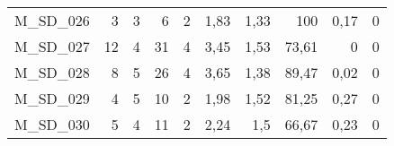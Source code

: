 \documentclass{article}
\begin{document}
\begin{table}[htbp]
\begin{tabular}{lrrrrrrrrr}
    M\_SD\_026 & 3    & 3    & 6    & 2    & 1,83 & 1,33 & 100  & 0,17 & 0 \\
    M\_SD\_027 & 12   & 4    & 31   & 4    & 3,45 & 1,53 & 73,61 & 0    & 0 \\
    M\_SD\_028 & 8    & 5    & 26   & 4    & 3,65 & 1,38 & 89,47 & 0,02 & 0 \\
    M\_SD\_029 & 4    & 5    & 10   & 2    & 1,98 & 1,52 & 81,25 & 0,27 & 0 \\
    M\_SD\_030 & 5    & 4    & 11   & 2    & 2,24 & 1,5  & 66,67 & 0,23 & 0 \\
    \bottomrule
    \end{tabular}%
  \label{tab:addlabel}%
\end{table}%
\end{document}
